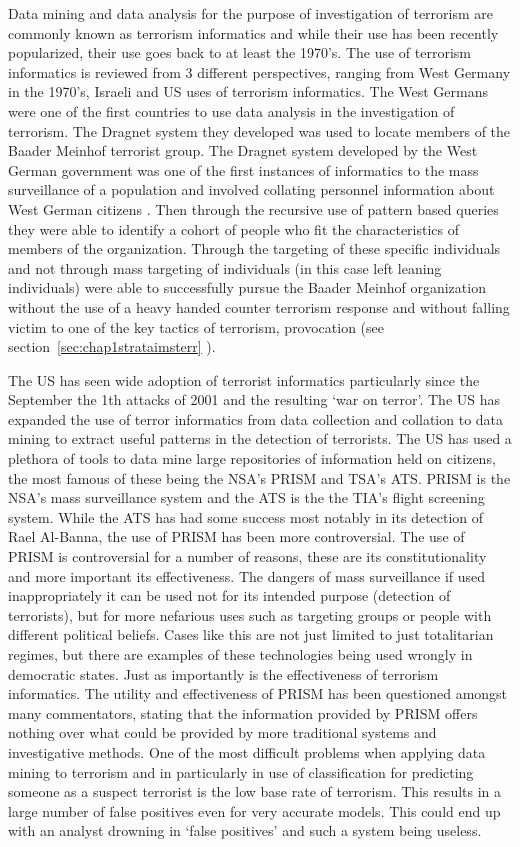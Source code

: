 Data mining and data analysis for the purpose of investigation of terrorism are commonly known as terrorism informatics and while their use has been recently popularized, their use goes back to at least the 1970’s.  The use of terrorism informatics is reviewed from 3 different perspectives, ranging from West Germany in the 1970’s, Israeli and US uses of terrorism informatics. The West Germans were one of the first countries to use data analysis in the investigation of terrorism. The Dragnet system they developed was used to locate members of the Baader Meinhof terrorist group. The Dragnet system developed by the West German government was one of the first instances of informatics to the mass surveillance of a population and involved collating personnel information about West German citizens . Then through the recursive use of pattern based queries they were able to identify a cohort of people who fit the characteristics of members of the organization. Through the targeting of these specific individuals and not through mass targeting of individuals (in this case left leaning individuals) were able to successfully pursue the Baader Meinhof organization without the use of a heavy handed counter terrorism response and without falling victim to one of the key tactics of terrorism, provocation (see section~\ref{sec:chap1strataimsterr} ).

The US has seen wide adoption of terrorist informatics particularly since the September the 1th attacks of 2001 and the resulting ‘war on terror’. The US has expanded the use of terror informatics from data collection and collation to data mining to extract useful patterns in the detection of terrorists. The US has used a plethora of tools to data mine large repositories of information held on citizens, the most famous of these being the NSA’s PRISM and TSA’s ATS. PRISM is the NSA’s mass surveillance system and the ATS is the the TIA’s flight screening system. While the ATS has had some success most notably in its detection of Rael Al-Banna, the use of PRISM has been more controversial. The use of PRISM is controversial for a number of reasons, these are its constitutionality \citep{park2013big} and more important its effectiveness. The dangers of mass surveillance if used inappropriately it can be used not for its intended purpose (detection of terrorists), but for more nefarious uses such as targeting groups or people with different political beliefs.  Cases like this are not just limited to just totalitarian regimes, but there are examples of these technologies being used wrongly in democratic states. Just as importantly is the effectiveness of terrorism informatics. The utility and effectiveness of PRISM has been questioned amongst many commentators, stating that the information provided by PRISM offers nothing over what could be provided by more traditional  systems and investigative methods. One of the most difficult problems when applying data mining to terrorism and in particularly in use of classification for predicting someone as a suspect terrorist is the low base rate of terrorism. This results in a large number of false positives even for very accurate models. This could end up with an analyst drowning in ‘false positives’ and such a system being useless.  

